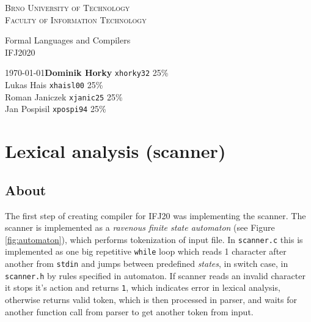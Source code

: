 \documentclass[11pt, titlepage]{article}
\begin{document}
\begin{titlepage}
    \begin{center}
        \textsc{\Huge{Brno University of Technology\\[0.3em]}}
        \textsc{\huge{Faculty of Information Technology}}
        
        
        \LARGE{Formal Languages and Compilers\\}
        \Huge{IFJ2020}
        
    \end{center}
    {
    		\Large{\today}{\hfill \textbf{Dominik Horky} \texttt{xhorky32} 25\% \\
    			\phantom{ }\hfill Lukas Hais \texttt{xhaisl00} 25\%\\ 
	    		\phantom{ }\hfill Roman Janiczek \texttt{xjanic25} 25\% \\
    			\phantom{ }\hfill Jan Pospisil \texttt{xpospi94} 25\% \\}
    	}
\end{titlepage}

\tableofcontents
\newpage


\section{Lexical analysis (scanner)}\label{lexical-analysis-scanner}

\subsection{About}\label{about}

The first step of creating compiler for IFJ20 was implementing the
scanner. The scanner is implemented as a \emph{ravenous finite state
automaton} (see Figure \ref{fig:automaton}), which performs tokenization of input file. In
\texttt{scanner.c} this is implemented as one big repetitive
\texttt{while} loop which reads 1 character after another from
\texttt{stdin} and jumps between predefined \emph{states}, in switch
case, in \texttt{scanner.h} by rules specified in automaton. If scanner
reads an invalid character it stops it's action and returns \texttt{1},
which indicates error in lexical analysis, otherwise returns valid
token, which is then processed in parser, and waits for another function call from
parser to get another token from input.
\end{document}
